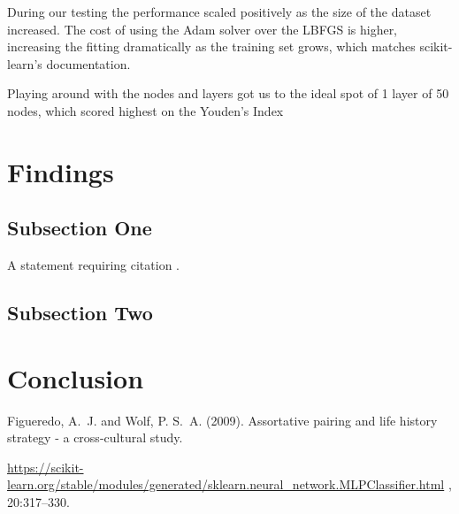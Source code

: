 \documentclass[twoside,twocolumn]{article}
\begin{document}
During our testing the performance scaled positively as the size of the dataset increased. The cost of using the Adam solver over the LBFGS is higher, increasing the fitting dramatically as the training set grows, which matches scikit-learn's documentation\cite{sklearn:MLPClassifier}.

Playing around with the nodes and layers got us to the ideal spot of 1 layer of 50 nodes, which scored highest on the Youden's Index %


\section{Findings}

\subsection{Subsection One}

A statement requiring citation \cite{Figueredo:2009dg}.
\blindtext %

\subsection{Subsection Two}

\blindtext %

\section{Conclusion}



\begin{thebibliography}{99} %

	Figueredo, A.~J. and Wolf, P. S.~A. (2009).
	\newblock Assortative pairing and life history strategy - a cross-cultural
	study.

	\url{https://scikit-learn.org/stable/modules/generated/sklearn.neural_network.MLPClassifier.html} , 20:317--330.

\end{thebibliography}

\end{document}
